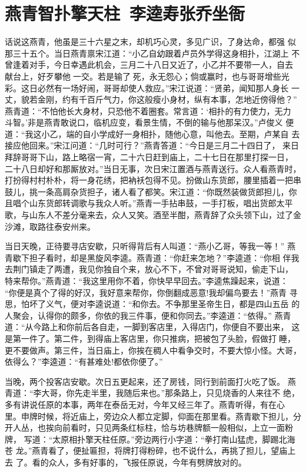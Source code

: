 \chapter{燕青智扑擎天柱~李逵寿张乔坐衙}

话说这燕青，他虽是三十六星之末，却机巧心灵，多见广识，了身达命，都强
似那三十五个。当日燕青禀宋江道：“小乙自幼跟着卢员外学得这身相扑，江湖上
不曾逢着对手，今日幸遇此机会，三月二十八日又近了，小乙并不要带一人，自去
献台上，好歹攀他一交。若是输了死，永无怨心；倘或赢时，也与哥哥增些光
彩。这日必然有一场好闹，哥哥却使人救应。”宋江说道：“贤弟，闻知那人身长
一丈，貌若金刚，约有千百斤气力，你这般瘦小身材，纵有本事，怎地近傍得他？”
燕青道：“不怕他长大身材，只恐他不着圈套。常言道：‘相扑的有力使力，无力
斗智。’非是燕青敢说口，临机应变，看景生情，不倒的输与他那呆汉。”卢俊义
便道：“我这小乙，端的自小学成好一身相扑，随他心意，叫他去。至期，卢某自
去接应他回来。”宋江问道：“几时可行？”燕青答道：“今日是三月二十四日了，
来日拜辞哥哥下山，路上略宿一宵，二十六日赶到庙上，二十七日在那里打探一日，
二十八日却好和那厮放对。”当日无事，次日宋江置酒与燕青送行。众人看燕青时，
打扮得村村朴朴，将一身花绣，把衲袄包得不见。扮做山东货郎，腰里插着一把串
鼓儿，挑一条高肩杂货担子，诸人看了都笑。宋江道：“你既然装做货郎担儿，你
且唱个山东货郎转调歌与我众人听。”燕青一手拈串鼓，一手打板，唱出货郎太平
歌，与山东人不差分毫来去，众人又笑。酒至半酣，燕青辞了众头领下山，过了金
沙滩，取路往泰安州来。

当日天晚，正待要寻店安歇，只听得背后有人叫道：“燕小乙哥，等我一等！”
燕青歇下担子看时，却是黑旋风李逵。燕青道：“你赶来怎地？”李逵道：“你相
伴我去荆门镇走了两遭，我见你独自个来，放心不下，不曾对哥哥说知，偷走下山，
特来帮你。”燕青道：“我这里用你不着，你快早早回去。”李逵焦躁起来，说道：
“你便是真个了得的好汉，我好意来帮你，你倒翻成恶意!我却偏鸟要去！”燕青
寻思，怕坏了义气，便对李逵说道：“和你去。不争那里圣帝生日，都是四山五岳
的人聚会，认得你的颇多，你依的我三件事，便和你同去。”李逵道：“依得。”
燕青道：“从今路上和你前后各自走，一脚到客店里，入得店门，你便自不要出来，
这是第一件了。第二件，到得庙上客店里，你只推病，把被包了头脸，假做打睡，
更不要做声。第三件，当日庙上，你挨在稠人中看争交时，不要大惊小怪。大哥，
依得么？”李逵道：“有甚难处!都依你便了。”

当晚，两个投客店安歇。次日五更起来，还了房钱，同行到前面打火吃了饭。
燕青道：“李大哥，你先走半里，我随后来也。”那条路上，只见烧香的人来往不
绝，多有讲说任原的本事，两年在泰岳无对，今年又经三年了。燕青听得，有在心
里。申牌时候，将近庙上，旁边众人都立定脚，仰面在那里看。燕青歇下担儿，分
开人丛，也挨向前看时，只见两条红标柱，恰与坊巷牌额一般相似，上立一面粉牌，
写道：“太原相扑擎天柱任原。”旁边两行小字道：“拳打南山猛虎，脚踢北海苍
龙。”燕青看了，便扯匾担，将牌打得粉碎，也不说什么，再挑了担儿，望庙上去
了。看的众人，多有好事的，飞报任原说，今年有劈牌放对的。

